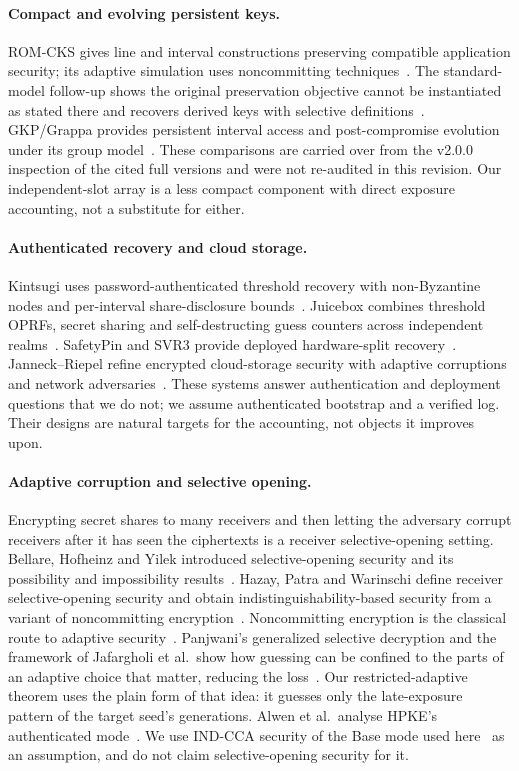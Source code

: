 \documentclass[pdflatex,sn-mathphys-num]{sn-jnl}
\theoremstyle{plain}
\theoremstyle{definition}
\begin{document}
\paragraph{Compact and evolving persistent keys.}
ROM-CKS gives line and interval constructions preserving compatible application security; its adaptive simulation uses noncommitting techniques~\cite{dodis2024}. The standard-model follow-up shows the original preservation objective cannot be instantiated as stated there and recovers derived keys with selective definitions~\cite{dodisstandard2024}. GKP/Grappa provides persistent interval access and post-compromise evolution under its group model~\cite{backendal2026}. These comparisons are carried over from the v2.0.0 inspection of the cited full versions and were not re-audited in this revision. Our independent-slot array is a less compact component with direct exposure accounting, not a substitute for either.

\paragraph{Authenticated recovery and cloud storage.}
Kintsugi uses password-authenticated threshold recovery with non-Byzantine nodes and per-interval share-disclosure bounds~\cite{ma2025}. Juicebox combines threshold OPRFs, secret sharing and self-destructing guess counters across independent realms~\cite{trapp2025}. SafetyPin and SVR3 provide deployed hardware-split recovery~\cite{dauterman2020,connell2024}. Janneck--Riepel refine encrypted cloud-storage security with adaptive corruptions and network adversaries~\cite{janneck2026}. These systems answer authentication and deployment questions that we do not; we assume authenticated bootstrap and a verified log. Their designs are natural targets for the accounting, not objects it improves upon.

\paragraph{Adaptive corruption and selective opening.}
Encrypting secret shares to many receivers and then letting the adversary corrupt receivers after it has seen the ciphertexts is a receiver selective-opening setting. Bellare, Hofheinz and Yilek introduced selective-opening security and its possibility and impossibility results~\cite{bellare2009}. Hazay, Patra and Warinschi define receiver selective-opening security and obtain indistinguishability-based security from a variant of noncommitting encryption~\cite{hazay2015}. Noncommitting encryption is the classical route to adaptive security~\cite{canetti1996}. Panjwani's generalized selective decryption and the framework of Jafargholi et al.\ show how guessing can be confined to the parts of an adaptive choice that matter, reducing the loss~\cite{panjwani2007,jafargholi2017}. Our restricted-adaptive theorem uses the plain form of that idea: it guesses only the late-exposure pattern of the target seed's generations. Alwen et al.\ analyse HPKE's authenticated mode~\cite{alwen2021}. We use IND-CCA security of the Base mode used here~\cite{rfc9180} as an assumption, and do not claim selective-opening security for it.
\end{document}

